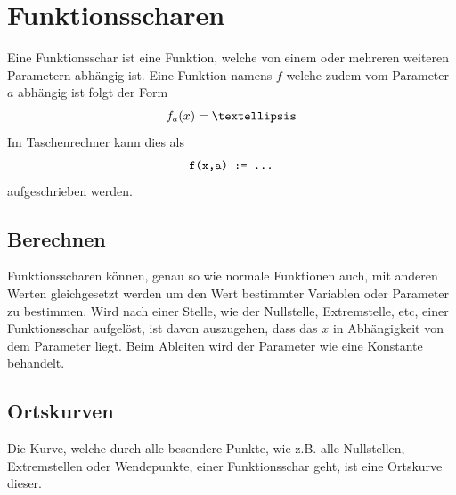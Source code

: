 \documentclass{article}
\begin{document}
 
\section{Funktionsscharen}
 
\begin{minipage}[t]{\dimexpr\textwidth-5cm}
 Eine Funktionsschar ist eine Funktion, welche von einem oder mehreren weiteren Parametern abhängig ist. Eine Funktion namens $f$ welche zudem vom Parameter $a$ abhängig ist folgt der Form
 \[
  f_a(x) = \textellipsis
 \]
 Im Taschenrechner kann dies als 
 \[
  \texttt{f(x,a) := \textellipsis} 
 \] 
 aufgeschrieben werden. 
\end{minipage}
\hfill
\begin{minipage}[t]{5cm}
  \centering
\end{minipage}
\subsection{Berechnen}
Funktionsscharen können, genau so wie normale Funktionen auch, mit anderen Werten gleichgesetzt werden um den Wert bestimmter Variablen oder Parameter zu bestimmen.
Wird nach einer Stelle, wie der Nullstelle, Extremstelle, etc, einer Funktionsschar aufgelöst, ist davon auszugehen, dass das $x$ in Abhängigkeit von dem Parameter liegt.   
Beim Ableiten wird der Parameter wie eine Konstante behandelt. 
 
\subsection{Ortskurven}
Die Kurve, welche durch alle besondere Punkte, wie z.B. alle Nullstellen, Extremstellen oder Wendepunkte, einer Funktionsschar geht, ist eine Ortskurve dieser.
 
\end{document}
